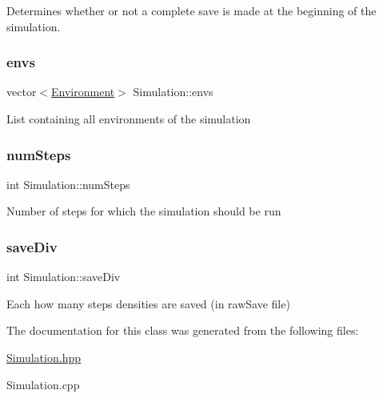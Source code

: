 Determines whether or not a complete save is made at the beginning of the simulation. \mbox{\label{classSimulation_a29309017ca18043de245ef843b56c533}} 
\subsubsection{\texorpdfstring{envs}{envs}}
{\footnotesize\ttfamily vector$<$\hyperlink{classEnvironment}{Environment}$>$ Simulation\+::envs\hspace{0.3cm}{\ttfamily [protected]}}

List containing all environments of the simulation \mbox{\label{classSimulation_a999ce13c1a3d4dca2bf92e346d8b709f}} 
\subsubsection{\texorpdfstring{num\+Steps}{numSteps}}
{\footnotesize\ttfamily int Simulation\+::num\+Steps\hspace{0.3cm}{\ttfamily [protected]}}

Number of steps for which the simulation should be run \mbox{\label{classSimulation_ae8f095e92da49a648954416b351e27c8}} 
\subsubsection{\texorpdfstring{save\+Div}{saveDiv}}
{\footnotesize\ttfamily int Simulation\+::save\+Div\hspace{0.3cm}{\ttfamily [protected]}}

Each how many steps densities are saved (in raw\+Save file) 

The documentation for this class was generated from the following files\+:\begin{DoxyCompactItemize}
\item 
\hyperlink{Simulation_8hpp}{Simulation.\+hpp}\item 
Simulation.\+cpp\end{DoxyCompactItemize}
